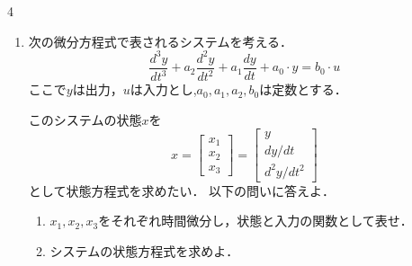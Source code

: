 \documentclass[fleqn]{article}
\renewcommand{\bmatrix}{\left[\begin{array}}
\newcommand{\ematrix}{\end{array}\right]}
\begin{document}
\begin{multicols}{4}
\begin{enumerate}
\begin{enumerate}
\item
$r \rightarrow \infty$なる評価関数を用いるということはどのような制御系を設計することに対応するのか，簡潔に述べよ．
\vspace{5cm}

\end{enumerate}

\vfill\null
\columnbreak




\item
次の微分方程式で表されるシステムを考える．
\[
	 \frac{d^3 y}{dt^3} + a_2 \frac{d^2 y}{dt^2} + a_1 \frac{d y}{dt} + a_0 \cdot y = b_0 \cdot u
\]
ここで$y$は出力，$u$は入力とし,$a_0,a_1,a_2,b_0$は定数とする．

このシステムの状態$x$を
\[
	x = \bmatrix{c} x_1 \\ x_2           \\ x_3             \ematrix
      = \bmatrix{c} y   \\ {dy}/{dt}     \\ {d^2 y}/{dt^2} \ematrix
\]
として状態方程式を求めたい．
以下の問いに答えよ．
\begin{enumerate}
\item 
$x_1, x_2, x_3$をそれぞれ時間微分し，状態と入力の関数として表せ．
\vspace{10cm}

\item
システムの状態方程式を求めよ．
\vspace{9cm}



\end{enumerate}






\end{enumerate}
\end{multicols}
\end{document}
